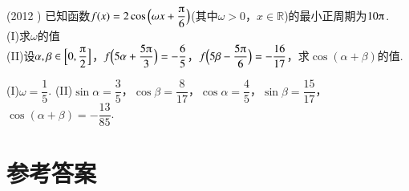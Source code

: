 \begin{exercise}
    \item%
      (2012 )
      已知函数$f(x)=2\cos{\Bigl(\omega x+\dfrac{\piup}6\Bigr)}$(其中$\omega>0$，$x\in\mathbb{R}$)的最小正周期为$10\piup$.\\
      (I)求$\omega$的值\\
      (II)设$\alpha,\beta\in\Bigl[0,\dfrac{\piup}2\Bigr]$，$f{\Bigl(5\alpha+\dfrac{5\piup}3\Bigr)}=-\dfrac{6}5$，$f{\Bigl(5\beta-\dfrac{5\piup}6\Bigr)}=-\dfrac{16}{17}$，求$\cos{(\alpha+\beta)}$的值.
      \begin{answer}
        (I)$\omega=\dfrac{1}5$.
        (II)$\sin\alpha=\dfrac{3}5$，$\cos\beta=\dfrac{8}{17}$，$\cos\alpha=\dfrac{4}5$，$\sin\beta=\dfrac{15}{17}$，$\cos{(\alpha+\beta)}=-\dfrac{13}{85}$.
      \end{answer}
\end{exercise}
\stopexercise

\newpage
\section{参考答案}
\begin{multicols}{2}
  \printanswer
\end{multicols}
